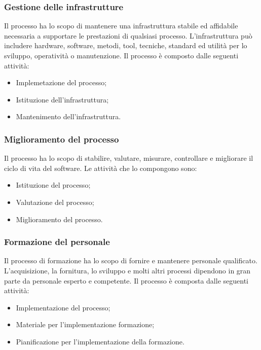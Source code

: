 \subsubsection{Gestione delle infrastrutture}
Il processo ha lo scopo di mantenere una infrastruttura stabile ed affidabile necessaria a supportare le prestazioni di qualsiasi processo. L’infrastruttura può includere hardware, software, metodi, tool, tecniche, standard ed utilità per lo sviluppo, operatività o manutenzione.
Il processo è composto dalle seguenti attività:
\begin{itemize}
	\item Implemetazione del processo;
	
	\item Istituzione dell'infrastruttura;
	
	\item Mantenimento dell'infrastruttura.
\end{itemize}

\subsubsection{Miglioramento del processo}
Il processo ha lo scopo di stabilire, valutare, misurare, controllare e migliorare il ciclo di vita del software. Le attività che lo compongono sono:
\begin{itemize}
	\item Istituzione del processo;
	
	\item Valutazione del processo;
	
	\item Miglioramento del processo.
\end{itemize}

\subsubsection{Formazione del personale}
Il processo di formazione ha lo scopo di fornire e mantenere personale qualificato. L'acquisizione, la fornitura, lo sviluppo e molti altri processi dipendono in gran parte da personale esperto e competente.
Il processo è composta dalle seguenti attività:
\begin{itemize}
	\item Implementazione del processo;
	
	\item Materiale per l'implementazione formazione;
	
	\item Pianificazione per l'implementazione della formazione.
\end{itemize}


